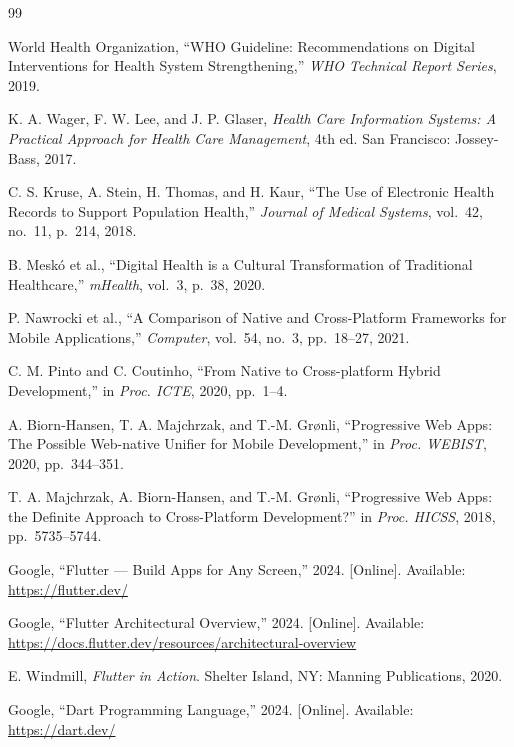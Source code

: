 \documentclass[12pt,a4paper,oneside]{report}
\begin{document}
\begin{thebibliography}{99}

 World Health Organization, ``WHO Guideline: Recommendations on
  Digital Interventions for Health System Strengthening,'' \emph{WHO Technical
  Report Series}, 2019.

 K. A. Wager, F. W. Lee, and J. P. Glaser, \emph{Health Care
  Information Systems: A Practical Approach for Health Care Management}, 4th ed.
  San Francisco: Jossey-Bass, 2017.

 C. S. Kruse, A. Stein, H. Thomas, and H. Kaur, ``The Use of
  Electronic Health Records to Support Population Health,'' \emph{Journal of
  Medical Systems}, vol.~42, no.~11, p.~214, 2018.

 B. Mesk\'o et al., ``Digital Health is a Cultural
  Transformation of Traditional Healthcare,'' \emph{mHealth}, vol.~3, p.~38,
  2020.

 P. Nawrocki et al., ``A Comparison of Native and
  Cross-Platform Frameworks for Mobile Applications,'' \emph{Computer}, vol.~54,
  no.~3, pp.~18--27, 2021.

 C. M. Pinto and C. Coutinho, ``From Native to Cross-platform
  Hybrid Development,'' in \emph{Proc. ICTE}, 2020, pp.~1--4.

 A. Biorn-Hansen, T. A. Majchrzak, and T.-M. Gr\o nli,
  ``Progressive Web Apps: The Possible Web-native Unifier for Mobile
  Development,'' in \emph{Proc. WEBIST}, 2020, pp.~344--351.

 T. A. Majchrzak, A. Biorn-Hansen, and T.-M. Gr\o nli,
  ``Progressive Web Apps: the Definite Approach to Cross-Platform
  Development?'' in \emph{Proc. HICSS}, 2018, pp.~5735--5744.

 Google, ``Flutter --- Build Apps for Any Screen,'' 2024.
  [Online]. Available: \url{https://flutter.dev/}

 Google, ``Flutter Architectural Overview,'' 2024.
  [Online]. Available:
  \url{https://docs.flutter.dev/resources/architectural-overview}

 E. Windmill, \emph{Flutter in Action}. Shelter Island,
  NY: Manning Publications, 2020.

 Google, ``Dart Programming Language,'' 2024. [Online].
  Available: \url{https://dart.dev/}


\end{thebibliography}
\end{document}
